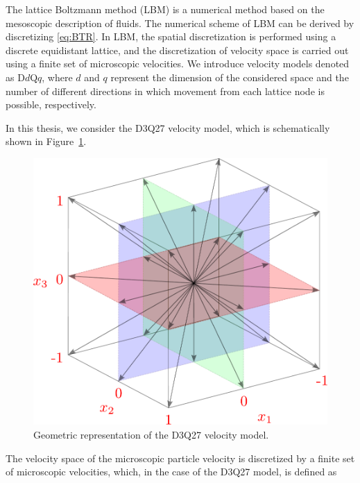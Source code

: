 The lattice Boltzmann method (LBM) is a numerical method based on the mesoscopic description of fluids. The numerical scheme of LBM can be derived by discretizing \eqref{eq:BTR}. In LBM, the spatial discretization is performed using a discrete equidistant lattice, and the discretization of velocity space is carried out using a finite set of microscopic velocities. We introduce velocity models denoted as D$d$Q$q$, where $ d$ and $q$ represent the dimension of the considered space and the number of different directions in which movement from each lattice node is possible, respectively.

In this thesis, we consider the D3Q27 velocity model, which is schematically shown in Figure~\ref{fig:d3q27}.

\begin{figure}[h]
	\centering
	\vspace{4mm}
	\includegraphics[width=.6\textwidth]{figures/d3q27.pdf}
	\caption{Geometric representation of the D3Q27 velocity model.}
	\label{fig:d3q27}
\end{figure}

The velocity space of the microscopic particle velocity is discretized by a finite set of microscopic velocities, which, in the case of the D3Q27 model, is defined as


